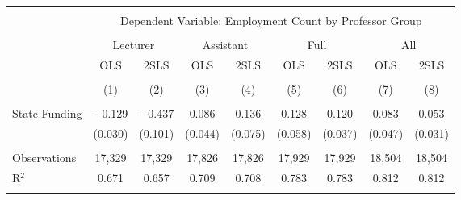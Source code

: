 
\begin{tabular}{@{\extracolsep{5pt}}lcccccccc} 
\\[-1.8ex]\hline 
\hline \\[-1.8ex] 
 & \multicolumn{8}{c}{Dependent Variable: Employment Count by Professor Group} \\ 
\cline{2-9} 
\\[-1.8ex] & \multicolumn{2}{c}{Lecturer} & \multicolumn{2}{c}{Assistant} & \multicolumn{2}{c}{Full} & \multicolumn{2}{c}{All} \\ 
 & OLS & 2SLS & OLS & 2SLS & OLS & 2SLS & OLS & 2SLS \\ 
\\[-1.8ex] & (1) & (2) & (3) & (4) & (5) & (6) & (7) & (8)\\ 
\hline \\[-1.8ex] 
 State Funding & $-$0.129 & $-$0.437 & 0.086 & 0.136 & 0.128 & 0.120 & 0.083 & 0.053 \\ 
  & (0.030) & (0.101) & (0.044) & (0.075) & (0.058) & (0.037) & (0.047) & (0.031) \\ 
 \hline \\[-1.8ex] 
Observations & 17,329 & 17,329 & 17,826 & 17,826 & 17,929 & 17,929 & 18,504 & 18,504 \\ 
R$^{2}$ & 0.671 & 0.657 & 0.709 & 0.708 & 0.783 & 0.783 & 0.812 & 0.812 \\ 
\hline 
\hline \\[-1.8ex] 
\end{tabular} 
